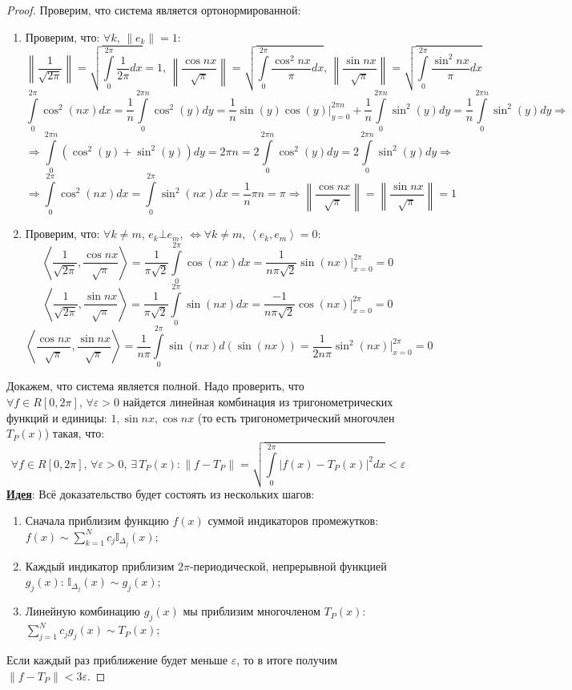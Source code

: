 \documentclass[12pt]{article}
\newcommand{\MTI}{\mathbb{I}}
\newcommand{\VE}{\varepsilon}
\theoremstyle{definition}
\newcommand{\ddsum}[2]{\displaystyle\sum\limits_{#1}^{#2}}
\newcommand{\ddint}[2]{\displaystyle\int\limits_{#1}^{#2}}
\newcommand{\inner}[2]{\left\langle #1, #2 \right\rangle }
\begin{document}
\begin{proof}
	Проверим, что система является ортонормированной:
	\begin{enumerate}[label=(\arabic*)]
		\item Проверим, что: $\forall k, \, \|e_k\| = 1$:
		$$
			\left\|\dfrac{1}{\sqrt{2\pi}}\right\| = \sqrt{\ddint{0}{2\pi}\dfrac{1}{2\pi}dx} = 1, \, \left\|\dfrac{\cos{nx}}{\sqrt{\pi}}\right\| = \sqrt{\ddint{0}{2\pi}\dfrac{\cos^2{nx}}{\pi}dx}, \, \left\|\dfrac{\sin{nx}}{\sqrt{\pi}}\right\| = \sqrt{\ddint{0}{2\pi}\dfrac{\sin^2{nx}}{\pi}dx}
		$$
		$$
			\ddint{0}{2\pi}\cos^2{(nx)}dx = \dfrac{1}{n}\ddint{0}{2\pi n}\cos^2{(y)}dy = \dfrac{1}{n}\sin{(y)}\cos{(y)}\biggl|_{y = 0}^{2\pi n} + \dfrac{1}{n}\ddint{0}{2\pi n}\sin^2{(y)}dy = \dfrac{1}{n}\ddint{0}{2\pi n}\sin^2{(y)}dy \Rightarrow
		$$
		$$
			\Rightarrow \ddint{0}{2\pi n}\left(\cos^2{(y)} + \sin^2{(y)}\right)dy = 2\pi n = 2 \ddint{0}{2 \pi n}\cos^2{(y)}dy = 2 \ddint{0}{2 \pi n}\sin^2{(y)}dy \Rightarrow
		$$
		$$
			\Rightarrow \ddint{0}{2\pi}\cos^2{(nx)}dx = \ddint{0}{2\pi}\sin^2{(nx)}dx = \dfrac{1}{n}\pi n = \pi \Rightarrow \left\|\dfrac{\cos{nx}}{\sqrt{\pi}}\right\|  = \left\|\dfrac{\sin{nx}}{\sqrt{\pi}}\right\| = 1
		$$
		\item Проверим, что: $\forall k \neq m, \, e_k \bot e_m, \, \Leftrightarrow  \forall k \neq m, \, \inner{e_k}{e_m} = 0$:
		$$
			\inner{\dfrac{1}{\sqrt{2\pi}}}{\dfrac{\cos{nx}}{\sqrt{\pi}}} = \dfrac{1}{\pi \sqrt{2}}\ddint{0}{2\pi}\cos{(nx)}dx = \dfrac{1}{n\pi \sqrt{2}}\sin{(nx)}\biggl|_{x = 0}^{2\pi} = 0
		$$
		$$
			\inner{\dfrac{1}{\sqrt{2\pi}}}{\dfrac{\sin{nx}}{\sqrt{\pi}}} = \dfrac{1}{\pi \sqrt{2}}\ddint{0}{2\pi}\sin{(nx)}dx = \dfrac{-1}{n\pi \sqrt{2}}\cos{(nx)}\biggl|_{x = 0}^{2\pi} = 0
		$$
		$$
			\inner{\dfrac{\cos{nx}}{\sqrt{\pi}}}{\dfrac{\sin{nx}}{\sqrt{\pi}}} = \dfrac{1}{n\pi }\ddint{0}{2\pi}\sin{(nx)}d(\sin{(nx)}) = \dfrac{1}{2n\pi }\sin^2{(nx)}\biggl|_{x = 0}^{2\pi} =0
		$$
	\end{enumerate}

	Докажем, что система является полной. Надо проверить, что $\forall f \in R[0,2\pi], \, \forall \VE > 0$ найдется линейная комбинация из тригонометрических функций и единицы: $1, \sin{nx}, \cos{nx}$ (то есть тригонометрический многочлен $T_P(x)$) такая, что:
	$$
		\forall f \in R[0,2\pi], \, \forall \VE > 0, \, \exists \, T_P(x) \colon \|f - T_P\| = \sqrt{\ddint{0}{2\pi}|f(x) - T_P(x)|^2dx} < \VE
	$$
	\textbf{\uline{Идея}}: Всё доказательство будет состоять из нескольких шагов:
	\begin{enumerate}[label=\arabic*)]
		\item 	Сначала приблизим функцию $f(x)$ суммой индикаторов промежутков: $f(x) \sim \ddsum{k =1}{N}c_j \MTI_{\Delta_j}(x)$; 
		\item Каждый индикатор приблизим $2\pi$-периодической, непрерывной функцией $g_j(x)$: $\MTI_{\Delta_j}(x) \sim g_j(x)$;
		\item Линейную комбинацию $g_j(x)$ мы приблизим многочленом $T_P(x)$: $\ddsum{j = 1}{N}c_jg_j(x) \sim T_P(x)$;
	\end{enumerate}
	Если каждый раз приближение будет меньше $\VE$, то в итоге получим $\|f - T_P\| < 3\VE$.
	

\end{proof}
\end{document}
